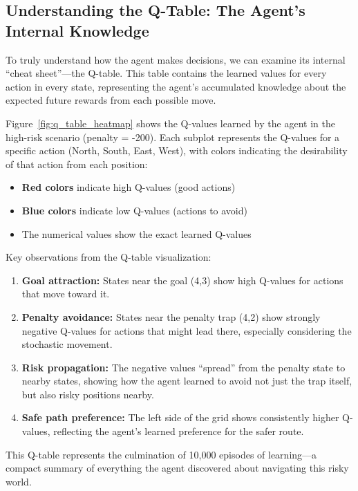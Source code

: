 \documentclass[11pt, a4paper]{article}
\begin{document}
\subsection{Understanding the Q-Table: The Agent's Internal Knowledge}
To truly understand how the agent makes decisions, we can examine its internal ``cheat sheet''—the Q-table. This table contains the learned values for every action in every state, representing the agent's accumulated knowledge about the expected future rewards from each possible move.

Figure~\ref{fig:q_table_heatmap} shows the Q-values learned by the agent in the high-risk scenario (penalty = -200). Each subplot represents the Q-values for a specific action (North, South, East, West), with colors indicating the desirability of that action from each position:

\begin{itemize}
    \item \textbf{Red colors} indicate high Q-values (good actions)
    \item \textbf{Blue colors} indicate low Q-values (actions to avoid)
    \item The numerical values show the exact learned Q-values
\end{itemize}

Key observations from the Q-table visualization:
\begin{enumerate}
    \item \textbf{Goal attraction:} States near the goal (4,3) show high Q-values for actions that move toward it.
    \item \textbf{Penalty avoidance:} States near the penalty trap (4,2) show strongly negative Q-values for actions that might lead there, especially considering the stochastic movement.
    \item \textbf{Risk propagation:} The negative values ``spread'' from the penalty state to nearby states, showing how the agent learned to avoid not just the trap itself, but also risky positions nearby.
    \item \textbf{Safe path preference:} The left side of the grid shows consistently higher Q-values, reflecting the agent's learned preference for the safer route.
\end{enumerate}

This Q-table represents the culmination of 10,000 episodes of learning—a compact summary of everything the agent discovered about navigating this risky world.
\end{document}
